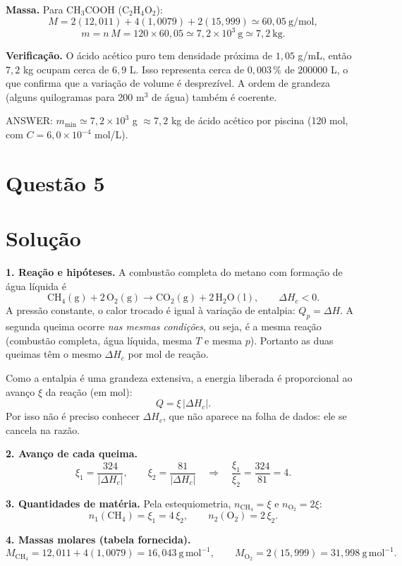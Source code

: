 \documentclass{article}%
\begin{document}
\textbf{Massa.} Para $\mathrm{CH_3COOH}$ ($\mathrm{C_2H_4O_2}$):
\[
M = 2(12{,}011)+4(1{,}0079)+2(15{,}999) \simeq 60{,}05\ \text{g/mol},
\]
\[
m = n\,M = 120 \times 60{,}05 \simeq 7{,}2\times10^{3}\ \text{g} \simeq 7{,}2\ \text{kg}.
\]

\textbf{Verificação.} O ácido acético puro tem densidade próxima de $1{,}05$ g/mL, então $7{,}2$ kg ocupam cerca de $6{,}9$ L. Isso representa cerca de $0{,}003\,\%$ de $200000$ L, o que confirma que a variação de volume é desprezível. A ordem de grandeza (alguns quilogramas para 200 m$^3$ de água) também é coerente.

\medskip
ANSWER: $m_{\min} \simeq 7{,}2\times10^{3}$ g $\approx 7{,}2$ kg de ácido acético por piscina (120 mol, com $C = 6{,}0\times10^{-4}$ mol/L).%
\newpage%
\section*{Questão 5}

\section*{Solução}

\textbf{1. Reação e hipóteses.} A combustão completa do metano com formação de água líquida é
\[
\mathrm{CH_4(g) + 2\,O_2(g) \longrightarrow CO_2(g) + 2\,H_2O(l)}, \qquad \Delta H_c < 0 .
\]
A pressão constante, o calor trocado é igual à variação de entalpia: $Q_p = \Delta H$. A segunda queima ocorre \emph{nas mesmas condições}, ou seja, é a mesma reação (combustão completa, água líquida, mesma $T$ e mesma $p$). Portanto as duas queimas têm o mesmo $\Delta H_c$ por mol de reação.

Como a entalpia é uma grandeza extensiva, a energia liberada é proporcional ao avanço $\xi$ da reação (em mol):
\[
Q = \xi\,|\Delta H_c| .
\]
Por isso não é preciso conhecer $\Delta H_c$, que não aparece na folha de dados: ele se cancela na razão.

\textbf{2. Avanço de cada queima.}
\[
\xi_1 = \frac{324}{|\Delta H_c|}, \qquad \xi_2 = \frac{81}{|\Delta H_c|}
\quad\Longrightarrow\quad \frac{\xi_1}{\xi_2} = \frac{324}{81} = 4 .
\]

\textbf{3. Quantidades de matéria.} Pela estequiometria, $n_{\mathrm{CH_4}} = \xi$ e $n_{\mathrm{O_2}} = 2\xi$:
\[
n_1(\mathrm{CH_4}) = \xi_1 = 4\,\xi_2, \qquad n_2(\mathrm{O_2}) = 2\,\xi_2 .
\]

\textbf{4. Massas molares (tabela fornecida).}
\[
M_{\mathrm{CH_4}} = 12{,}011 + 4(1{,}0079) = 16{,}043\ \mathrm{g\,mol^{-1}}, \qquad
M_{\mathrm{O_2}} = 2(15{,}999) = 31{,}998\ \mathrm{g\,mol^{-1}} .
\]
\end{document}
